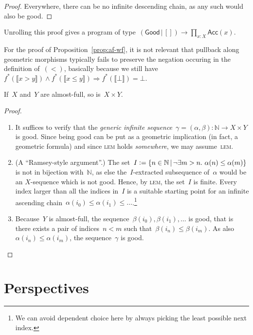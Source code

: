 \documentclass[envcountsect,envcountsame,runningheads]{llncs}
\newcommand{\xxx}[1]{}
\newcommand{\NN}{\mathbb{N}}
\newcommand{\defeq}{\vcentcolon=}
\renewcommand{\_}{\mathpunct{.}\,}
\newcommand{\?}{\,{:}\,}
\begin{document}
\begin{proof}Everywhere, there can be no infinite descending chain, as any
such would also be good.\end{proof}

Unrolling this proof gives a program of type~$(\textsf{Good} \,|\, []) \to
\prod_{x:X} \textsf{Acc}(x)$.

\begin{remark}For the proof of Proposition~\ref{prop:af-wf}, it is not relevant
that pullback along geometric morphisms typically fails to preserve the
negation occuring in the definition of~$({<})$, basically because we still
have~$f^*(\llbracket x > y \rrbracket) \wedge f^*(\llbracket x \leq y
\rrbracket) \Rightarrow f^*(\llbracket\bot\rrbracket) = \bot$.\end{remark}

\begin{theorem} If~$X$ and~$Y$ are almost-full,
so is~$X \times Y$.\end{theorem}

\begin{proof}
  \begin{enumerate}
    \item It suffices to verify that the \emph{generic infinite
    sequence}~$\gamma = (\alpha,\beta) : \NN \to X \times Y$ is good. Since
    being good can be put as a geometric implication (in fact, a geometric
    formula) and since \textsc{lem} holds \emph{somewhere}, we may assume~\textsc{lem}.

    \item (A ``Ramsey-style argument''.) The set~$I \defeq \{ n \in \NN \,|\, \neg\exists m > n\_ \alpha(n) \leq \alpha(m) \}$ is not in bijection with~$\NN$, as else the~$I$-extracted subsequence of~$\alpha$ would be an $X$-sequence which is not good. Hence, by \textsc{lem}, the set~$I$ is finite. Every index larger than all the indices in~$I$ is a suitable starting point for an infinite ascending chain~$\alpha(i_0) \leq \alpha(i_1) \leq \ldots$.\footnote{We can avoid dependent
    choice here by always picking the
    least possible next index.}

    \item Because~$Y$ is almost-full, the sequence~$\beta(i_0),\beta(i_1),\ldots$ is good, that is there exists a pair of indices~$n < m$ such that~$\beta(i_n) \leq \beta(i_m)$. As also~$\alpha(i_n) \leq \alpha(i_m)$, the sequence~$\gamma$ is good.
  \end{enumerate}
\end{proof}


\section{Perspectives}

\xxx{determine modal laws}

\xxx{more case studies}

\xxx{don't forget right adjoints}

\xxx{predicative}



\end{document}
